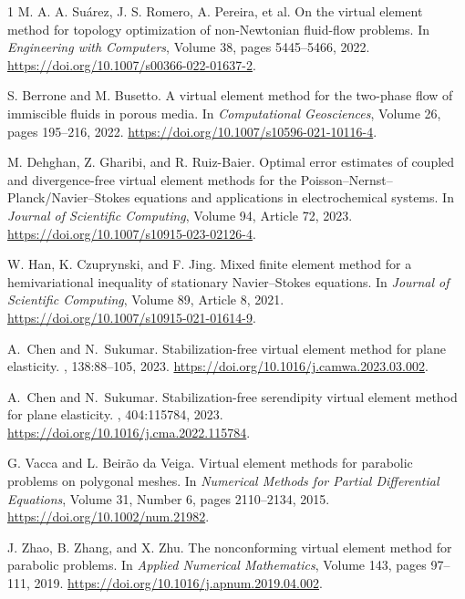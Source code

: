 \documentclass{article}
\begin{document}
\begin{thebibliography}{1}
M. A. A. Suárez, J. S. Romero, A. Pereira, et al.
\newblock On the virtual element method for topology optimization of non-Newtonian fluid-flow problems.
\newblock In {\em Engineering with Computers}, Volume 38, pages 5445--5466, 2022.
\newblock \url{https://doi.org/10.1007/s00366-022-01637-2}.

S. Berrone and M. Busetto.
\newblock A virtual element method for the two-phase flow of immiscible fluids in porous media.
\newblock In {\em Computational Geosciences}, Volume 26, pages 195--216, 2022.
\newblock \url{https://doi.org/10.1007/s10596-021-10116-4}.

M. Dehghan, Z. Gharibi, and R. Ruiz-Baier.
\newblock Optimal error estimates of coupled and divergence-free virtual element methods for the Poisson--Nernst--Planck/Navier--Stokes equations and applications in electrochemical systems.
\newblock In {\em Journal of Scientific Computing}, Volume 94, Article 72, 2023.
\newblock \url{https://doi.org/10.1007/s10915-023-02126-4}.

W. Han, K. Czuprynski, and F. Jing.
\newblock Mixed finite element method for a hemivariational inequality of stationary Navier--Stokes equations.
\newblock In {\em Journal of Scientific Computing}, Volume 89, Article 8, 2021.
\newblock \url{https://doi.org/10.1007/s10915-021-01614-9}.

A.~Chen and N.~Sukumar.
\newblock Stabilization-free virtual element method for plane elasticity.
, 138:88--105, 2023.
\newblock \url{https://doi.org/10.1016/j.camwa.2023.03.002}.

A.~Chen and N.~Sukumar.
\newblock Stabilization-free serendipity virtual element method for plane elasticity.
, 404:115784, 2023.
\newblock \url{https://doi.org/10.1016/j.cma.2022.115784}.

G. Vacca and L. Beirão da Veiga.
\newblock Virtual element methods for parabolic problems on polygonal meshes.
\newblock In {\em Numerical Methods for Partial Differential Equations}, Volume 31, Number 6, pages 2110--2134, 2015.
\newblock \url{https://doi.org/10.1002/num.21982}.

J. Zhao, B. Zhang, and X. Zhu.
\newblock The nonconforming virtual element method for parabolic problems.
\newblock In {\em Applied Numerical Mathematics}, Volume 143, pages 97--111, 2019.
\newblock \url{https://doi.org/10.1016/j.apnum.2019.04.002}.


\end{thebibliography}
\end{document}

